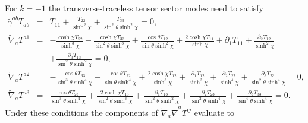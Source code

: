 \documentclass[aps,onecolumn,10pt]{revtex4}
\numberwithin{equation}{section}
\numberwithin{equation}{section}
\begin{document}
For $k=-1$ the transverse-traceless tensor sector modes need to satisfy 
%
\begin{eqnarray}
 \tilde{\gamma}^{ab}T_{ab}&=& T_{11} + \frac{T_{22}}{\sinh^2\chi} + \frac{T_{33}}{\sin^2\theta \sinh^2\chi} =0,
\nonumber\\
\tilde\nabla_a T^{a 1}&=& - \frac{\cosh\chi T_{22}}{\sinh^3\chi} -  \frac{\cosh\chi T_{33}}{\sin^2\theta \sinh^3\chi} + \frac{\cos\theta T_{12}}{\sin\theta \sinh^2\chi} + \frac{2 \cosh\chi T_{11}}{\sinh\chi} + \partial_{1}T_{11} + \frac{\partial_{2}T_{12}}{\sinh^2\chi} \nonumber \\ 
&& + \frac{\partial_{3}T_{13}}{\sin^2\theta \sinh^2\chi}=0, \nonumber\\
\tilde\nabla_a T^{a 2}&=& - \frac{\cos\theta T_{33}}{\sin^3\theta \sinh^4\chi} + \frac{\cos\theta T_{22}}{\sin\theta \sinh^4\chi} + \frac{2 \cosh\chi T_{12}}{\sinh^3\chi} + \frac{\partial_{1}T_{12}}{\sinh^2\chi} + \frac{\partial_{2}T_{22}}{\sinh^4\chi} + \frac{\partial_{3}T_{23}}{\sin^2\theta \sinh^4\chi}=0,
\nonumber\\
\tilde\nabla_a T^{a 3}&=& \frac{\cos\theta T_{23}}{\sin^3\theta \sinh^4\chi} + \frac{2 \cosh\chi T_{13}}{\sin^2\theta \sinh^3\chi} + \frac{\partial_{1}T_{13}}{\sin^2\theta \sinh^2\chi} + \frac{\partial_{2}T_{23}}{\sin^2\theta \sinh^4\chi} + \frac{\partial_{3}T_{33}}{\sin^4\theta \sinh^4\chi}=0.
\label{10.31b}
\end{eqnarray}
%
Under these conditions the components of $\tilde{\nabla}_a\tilde{\nabla}^aT^{ij}$ evaluate to
%
\end{document}
